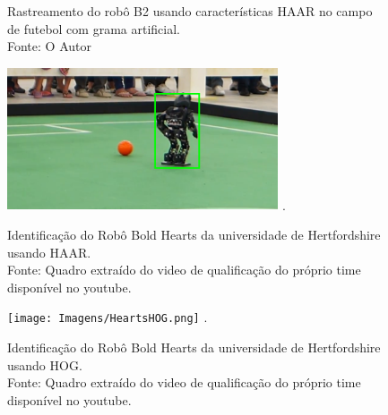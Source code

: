\begin{figure}[!hH]
    \centering
    \qquad
    \qquad
    \qquad
    \qquad
    \qquad
    \qquad
    \qquad
    \qquad
    \qquad
    \qquad
    \qquad

    \caption{Rastreamento do robô B2 usando características HAAR no campo de futebol com grama artificial.\\ Fonte: O Autor}
    \label{fig:Art}
\end{figure}


\begin{figure}[!hH]
\centering
\includegraphics[width=8cm]{Imagens/HeartsHAAR.png}
\DeclareGraphicsExtensions.
\caption{Identificação do Robô Bold Hearts \cite{Bold} da universidade de Hertfordshire usando HAAR. \\ Fonte: Quadro extraído do video de qualificação do próprio time disponível no youtube.}
\label{fig_HeHAAR}
\end{figure}

\begin{figure}[!hH]
\centering
\texttt{[image: Imagens/HeartsHOG.png]}
\DeclareGraphicsExtensions.
\caption{Identificação do Robô Bold Hearts \cite{Bold} da universidade de Hertfordshire usando HOG.\\ Fonte: Quadro extraído do video de qualificação do próprio time disponível no youtube.}
\label{fig_HeHOG}
\end{figure}


